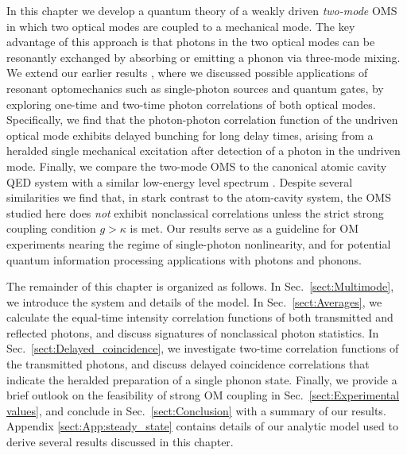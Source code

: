 In this chapter we develop a quantum theory of a weakly driven
\emph{two-mode} OMS
\cite{Miao2009, Stannigel2012,Ludwig2012, BasiriEsfahani2012} 
in which two optical modes are coupled to
a mechanical mode. 
The key advantage of this approach is that
 photons in the two optical modes can be resonantly exchanged by absorbing or
 emitting a phonon via three-mode mixing.
 We extend our earlier results \cite{Stannigel2012}, where we discussed possible
 applications of resonant optomechanics such as single-photon sources and
 quantum gates,
 by exploring one-time and two-time photon correlations 
 of both optical modes.
 Specifically, we find that the photon-photon correlation function of the
 undriven optical mode exhibits delayed bunching for long delay times,
 arising from a heralded single mechanical excitation after detection of a
 photon in the undriven mode.
 Finally, we compare the two-mode OMS
 to the canonical atomic cavity QED system with 
 a similar low-energy level spectrum
 \cite{Carmichael1991, Brecha1999}.
 Despite several similarities we find that, 
 in stark contrast to the atom-cavity system, the OMS studied
 here does {\it not} exhibit nonclassical
 correlations unless the strict strong coupling condition $g >
 \kappa$ is met.
Our results serve as a guideline for OM experiments 
nearing the regime of 
single-photon nonlinearity, and for
potential quantum information processing applications
with photons and phonons.



The remainder of this chapter is organized as follows. 
In
Sec.~\ref{sect:Multimode}, we introduce the system and details of the model.
In Sec.~\ref{sect:Averages}, we calculate the equal-time intensity correlation
functions of both  transmitted and  reflected photons, and discuss
signatures of nonclassical photon statistics.
In Sec.~\ref{sect:Delayed_coincidence}, 
we investigate two-time correlation functions
of the transmitted photons, and discuss delayed
coincidence correlations that indicate the heralded
preparation of a single phonon state.
Finally, we provide
a brief outlook on the feasibility of strong OM coupling 
in Sec.~\ref{sect:Experimental values}, 
and 
conclude
in Sec.~\ref{sect:Conclusion} with a summary of our
results.
Appendix \ref{sect:App:steady_state} contains details of our analytic model used to
derive several results discussed in this chapter.



